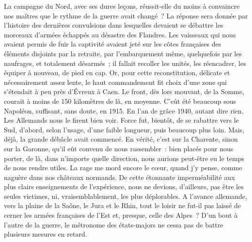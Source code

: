 \documentclass[french,twoside]{book} %
\begin{document}
La campagne du Nord, avec ses dures leçons, réussit-elle du moins à convaincre nos maîtres que le rythme de la guerre avait changé ? La réponse sera donnée par l’histoire des dernières convulsions   dans lesquelles devaient se débattre les morceaux d’armées échappés au désastre des Flandres. Les vaisseaux qui nous avaient permis de fuir la captivité avaient jeté sur les côtes françaises des éléments disjoints par la retraite, par l’embarquement même, quelquefois par les naufrages, et totalement désarmés ; il fallait recoller les unités, les réencadrer, les équiper à nouveau, de pied en cap. Or, pour cette reconstitution, délicate et nécessairement assez lente, le haut commandement fit choix d’une zone qui s’étendait à peu près d’Évreux à Caen. Le front, dès lors mouvant, de la Somme, courait à moins de 150 kilomètres de là, en moyenne. C’eût été beaucoup sous Napoléon, suffisant, sans doute, en 1915. En l’an de grâce 1940, autant dire rien. Les Allemands nous le firent bien voir. Force fut, bientôt, de se rabattre vers le Sud, d’abord, selon l’usage, d’une faible longueur, puis beaucoup plus loin. Mais, déjà, la grande débâcle avait commencé. En vérité, c’est sur la Charente, sinon sur la Garonne, qu’il eût convenu de nous rassembler : bien placés pour nous porter, de là, dans n’importe quelle direction, nous aurions peut-être eu le temps de nous rendre utiles. La rage me mord encore le cœur, quand j’y pense, comme naguère dans nos châteaux normands. De cette étonnante imperméabilité aux plus clairs enseignements de l’expérience, nous ne devions, d’ailleurs, pas être les seules victimes, ni, vraisemblablement, les plus déplorables. A l’avance allemande, vers la plaine de la Saône, le Jura et le Rhin, tout le loisir ne fut-il pas laissé de cerner les armées françaises de l’Est et, presque, celle des Alpes ? D’un bout à l’autre de la guerre, le métronome des états-majors ne cessa pas de battre plusieurs mesures en retard.\par
\end{document}
